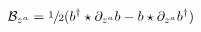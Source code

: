 \begin{equation}\label{eq:decb}
 \mathcal{B}_{z^a}=\sfrac{1}{2}
 (b^\dagger\star\partial_{z^a}b-b\star\partial_{z^a}
  b^\dagger)
\end{equation}

